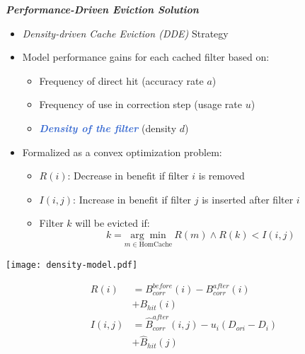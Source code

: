 \documentclass[portrait,a1paper,fontscale=0.42]{baposter}
\begin{document}
\begin{poster}
{    \vspace{0.5em}
    \textbf{\textit{Performance-Driven Eviction Solution}}
    \begin{itemize}
        \item \textit{Density-driven Cache Eviction (DDE)} Strategy
        \item Model performance gains for each cached filter based on:
        \begin{itemize}
            \item Frequency of direct hit (accuracy rate $a$)
            \item Frequency of use in correction step (usage rate $u$)
            \item \textcolor{highlight}{\textbf{\textit{Density of the filter}}} (density $d$)
        \end{itemize}
        \vspace{0.5em}
        \item Formalized as a convex optimization problem:
        \begin{itemize}
            \item $R(i)$: Decrease in benefit if filter $i$ is removed
            \item $I(i,j)$: Increase in benefit if filter $j$ is inserted after filter $i$
            \item Filter $k$ will be evicted if: 
            $$ k = \underset{m \in \text{HomCache}}{\arg\min}\ R(m) \wedge R(k) < I(i,j) $$
        \end{itemize}
    \end{itemize}

    \begin{center}
        \begin{minipage}[c]{0.53\textwidth}\vspace{0pt}
            \centering
            \texttt{[image: density-model.pdf]}
        \end{minipage}%
        \begin{minipage}[c]{0.45\textwidth}\vspace{0pt}
            \scriptsize
            \begin{equation*}
            \begin{aligned}
                R(i)   &= B_{corr}^{before}(i)-B_{corr}^{after}(i)\\
                       &+ B_{hit}(i) \\
                I(i,j) &= \hat{B}_{corr}^{after}(i,j) - u_i(D_{ori}-D_i)\\
                       &+ \hat{B}_{hit}(j)
            \end{aligned}
            \end{equation*}
        \end{minipage}
    \end{center}    

}
\end{poster}
\end{document}
